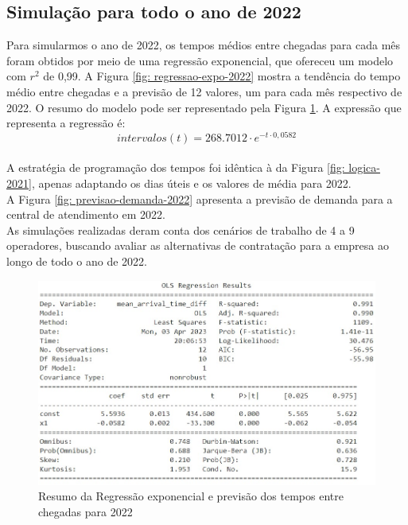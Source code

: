 \subsection{Simulação para todo o ano de 2022}
\label{section: sim-2022}
Para simularmos o ano de 2022, os tempos médios entre chegadas para cada mês foram obtidos por meio de uma regressão exponencial, que ofereceu um modelo com $r^2$ de 0,99. A Figura \ref*{fig: regressao-expo-2022} mostra a tendência do tempo médio entre chegadas e a previsão de 12 valores, um para cada mês respectivo de 2022. O resumo do modelo pode ser representado pela Figura \ref*{fig: resumo-expo-2022}. A expressão que representa a regressão é: $$intervalos(t) = 268.7012 \cdot e^{-t \cdot 0,0582}$$\\
A estratégia de programação dos tempos foi idêntica à da Figura \ref*{fig: logica-2021}, apenas adaptando os dias úteis e os valores de média para 2022.\\
A Figura \ref*{fig: previsao-demanda-2022} apresenta a previsão de demanda para a central de atendimento em 2022.\\
As simulações realizadas deram conta dos cenários de trabalho de 4 a 9 operadores, buscando avaliar as alternativas de contratação para a empresa ao longo de todo o ano de 2022.

\begin{figure}[H]
    \centering
    \includegraphics[scale=0.85]{simulacao/resumo_OLS_previsao2022.jpg}
    \caption{Resumo da Regressão exponencial e previsão dos tempos entre chegadas para 2022}
    \label{fig: resumo-expo-2022}
\end{figure}


